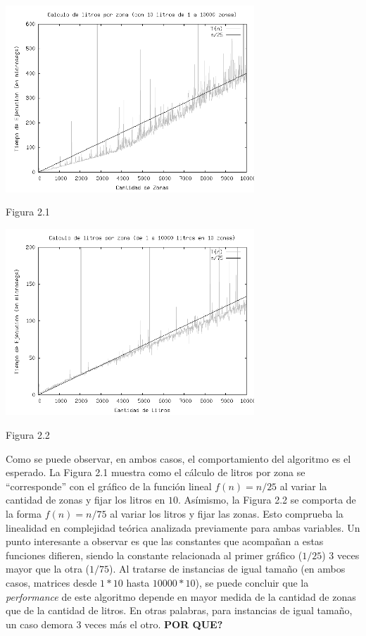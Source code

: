 \documentclass[a4paper,11pt] {article}
\begin{document}
\begin{center}
 \includegraphics[width=0.7\textwidth]{Plots/Tp2Ej1-TiemposLitrosPorZonaPorZonas-10litros-bw.png}
\begin{center}
Figura 2.1
\end{center}
 \includegraphics[width=0.7\textwidth]{Plots/Tp2Ej1-TiemposLitrosPorZonaPorZonas-10zonas-bw.png}
\begin{center}
Figura 2.2
\end{center}
\end{center}

Como se puede observar, en ambos casos, el comportamiento del algoritmo es el esperado. La Figura 2.1 muestra como el c\'alculo de litros por zona se ``corresponde'' con el gr\'afico de la funci\'on lineal $f(n) = n/25$ al variar la cantidad de zonas y fijar los litros en $10$. As\'imismo, la Figura 2.2 se comporta de la forma $f(n) = n/75$ al variar los litros y fijar las zonas. Esto comprueba la linealidad en complejidad te\'orica analizada previamente para ambas variables. Un punto interesante a observar es que las constantes que acompañan a estas funciones difieren, siendo la constante relacionada al primer gr\'afico ($1/25$) 3 veces mayor que la otra ($1/75$). Al tratarse de instancias de igual tamaño (en ambos casos, matrices desde $1*10$ hasta $10000*10$), se puede concluir que la \textit{performance} de este algoritmo depende en mayor medida de la cantidad de zonas que de la cantidad de litros. En otras palabras, para instancias de igual tamaño, un caso demora 3 veces m\'as el otro. \textbf{POR QUE?}
\end{document}
